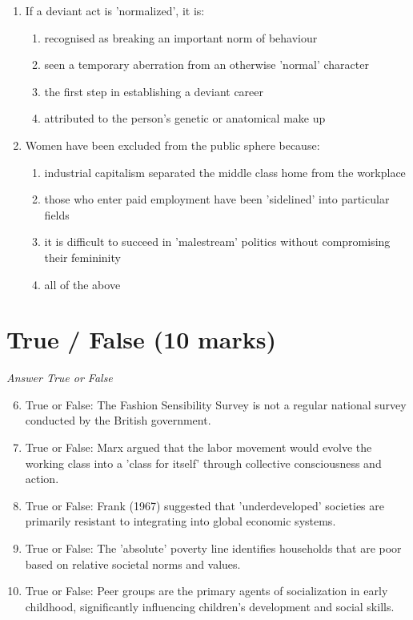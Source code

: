 \documentclass[12pt]{article}
\begin{document}
\begin{enumerate}[label=\arabic*.]
\item If a deviant act is 'normalized', it is:
\begin{enumerate}[label=(\alph*)]
    \item recognised as breaking an important norm of behaviour
    \item seen a temporary aberration from an otherwise 'normal' character
    \item the first step in establishing a deviant career
    \item attributed to the person's genetic or anatomical make up
\end{enumerate}
\item Women have been excluded from the public sphere because:
\begin{enumerate}[label=(\alph*)]
    \item industrial capitalism separated the middle class home from the workplace
    \item those who enter paid employment have been 'sidelined' into particular fields
    \item it is difficult to succeed in 'malestream' politics without compromising their femininity
    \item all of the above
\end{enumerate}
\end{enumerate}

\section*{True / False (10 marks)}
\textit{Answer True or False}
\begin{enumerate}[label=\arabic*.]
\setcounter{enumi}{5}
\item True or False: The Fashion Sensibility Survey is not a regular national survey conducted by the British government.
\item True or False: Marx argued that the labor movement would evolve the working class into a 'class for itself' through collective consciousness and action.
\item True or False: Frank (1967) suggested that 'underdeveloped' societies are primarily resistant to integrating into global economic systems.
\item True or False: The 'absolute' poverty line identifies households that are poor based on relative societal norms and values.
\item True or False: Peer groups are the primary agents of socialization in early childhood, significantly influencing children's development and social skills.
\end{enumerate}
\end{document}
